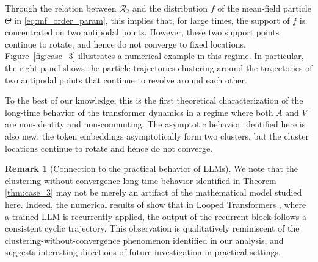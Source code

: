 \documentclass[10pt]{article}
\theoremstyle{definition}
\theoremstyle{definition}
\newtheorem{remark}[theorem]{Remark}
\numberwithin{equation}{section}
\newcommand{\CR}{\mathcal{R}}
\begin{document}
Through the relation between $\CR_2$ and the distribution $f$ of the mean-field particle $\Theta$ in \eqref{eq:mf_order_param}, this implies that, for large times, the support of $f$ is concentrated on two antipodal points.
However, these two support points continue to rotate, and hence do not converge to fixed locations.
Figure~\ref{fig:case_3} illustrates a numerical example in this regime.
In particular, the right panel shows the particle trajectories clustering around the trajectories of two antipodal points that continue to revolve around each other.

To the best of our knowledge, this is the first theoretical characterization of the long-time behavior of the transformer dynamics in a regime where both $A$ and $V$ are non-identity and non-commuting. 
The asymptotic behavior identified here is also new: the token embeddings asymptotically form two clusters, but the cluster locations continue to rotate and hence do not converge.

\begin{remark}[Connection to the practical behavior of LLMs]
We note that the clustering-without-convergence long-time behavior identified in Theorem \ref{thm:case_3} may not be merely an artifact of the mathematical model studied here. Indeed, the numerical results of \cite{blayney2026mechanistic} show that in Looped Transformers \cite{giannou2023looped,yang2024looped,geiping2026scaling}, where a trained LLM is recurrently applied, the output of the recurrent block follows a consistent cyclic trajectory.
This observation is qualitatively reminiscent of the clustering-without-convergence phenomenon identified in our analysis, and suggests interesting directions of future investigation in practical settings. 
\end{remark}
\end{document}
